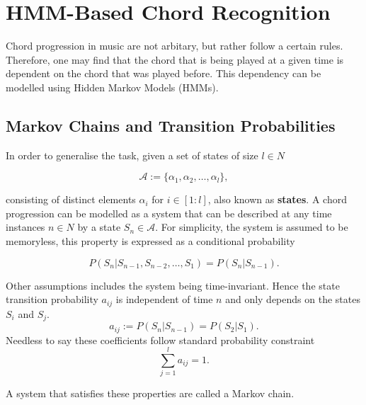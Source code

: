 \documentclass[a4paper, 9pt, twocolumn]{extarticle}
\begin{document}
\section{HMM-Based Chord Recognition}
\label{section:HMM_recognition}
Chord progression in music are not arbitary, but rather follow a certain rules. Therefore, one may find that the chord that is being played at a given time is dependent on the chord that was played before. This dependency can be modelled using Hidden Markov Models (HMMs).
\subsection{Markov Chains and Transition Probabilities}
\label{subsection:Markov_chain}
In order to generalise the task, given a set of states of size $l \in N$

\begin{equation}
    \mathcal{A} := \{\alpha_1, \alpha_2, \ldots, \alpha_l\},
\end{equation}

consisting of distinct elements $\alpha_i$ for $i \in [1:l]$, also known as \textbf{states}.\cite{manning1999foundations}
A chord progression can be modelled as a system that can be described at any time instances $n \in N$ by a state $S_n \in \mathcal{A}$.
For simplicity, the system is assumed to be memoryless, this property is expressed as a conditional probability

\begin{equation}
    P(S_n | S_{n-1}, S_{n-2}, \ldots, S_1) = P(S_n | S_{n-1}).
\end{equation}

Other assumptions includes the system being time-invariant. Hence the state transition probability $a_{ij}$ is independent of time $n$ and only depends on the states $S_i$ and $S_j$. 
\begin{equation}
    a_{ij} := P(S_n | S_{n-1}) = P(S_2 | S_1).
\end{equation}
Needless to say these coefficients follow standard probability constraint
\begin{equation}
    \sum_{j=1}^{l} a_{ij} = 1.
\end{equation}

A system that satisfies these properties are called a Markov chain.
\end{document}

